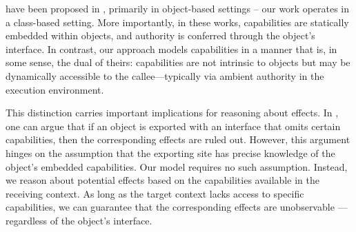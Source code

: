 
 {%
have been proposed in
\cite{vanproving,ddd,vmsl-pldi2023,irisWasm23},
 {primarily in object-based settings -- our work operates in a class-based setting.}
 More importantly, in these  works,  capabilities are statically embedded within objects, and authority is conferred through the object’s interface. In contrast, our approach models capabilities in a manner that is, in some sense, the dual of theirs: capabilities are not intrinsic to objects but may be 
 {dynamically accessible to the callee—typically via ambient authority in the execution environment.}}
 
 {This distinction carries important implications for reasoning  about   effects. 
 In  
\cite{vanproving,ddd,vmsl-pldi2023,irisWasm23},
one can argue that if an object is exported with an interface that omits certain capabilities, then the corresponding effects are  ruled out. 
 However, this argument hinges on the assumption that the exporting site has precise knowledge of the object’s embedded capabilities.
 Our model requires no such assumption. Instead, we reason about potential effects based on the capabilities available in the receiving context.  
{As long as the target context lacks access to specific capabilities}, we can guarantee that the corresponding effects are unobservable —regardless of the object’s interface.
 }

 


